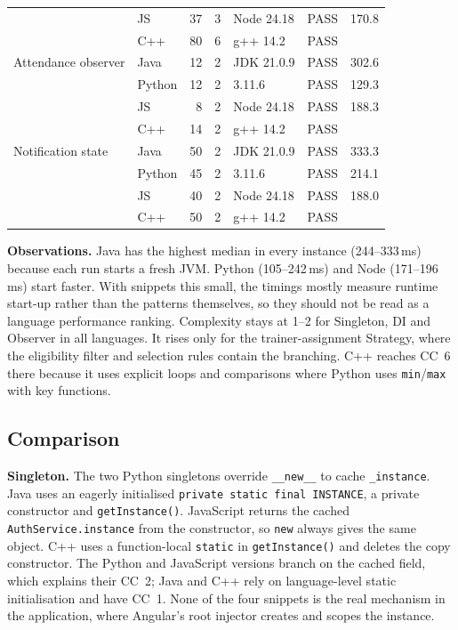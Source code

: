\documentclass[11pt,a4paper]{article}
\begin{document}
{\begin{longtable}{@{}llrrll r@{}}
 & JS & 37 & 3 & Node 24.18 & PASS & 170.8\\
 & C++ & 80 & 6 & g++ 14.2 & PASS & \\
\midrule
Attendance observer & Java & 12 & 2 & JDK 21.0.9 & PASS & 302.6\\
 & Python & 12 & 2 & 3.11.6 & PASS & 129.3\\
 & JS & 8 & 2 & Node 24.18 & PASS & 188.3\\
 & C++ & 14 & 2 & g++ 14.2 & PASS & \\
\midrule
Notification state & Java & 50 & 2 & JDK 21.0.9 & PASS & 333.3\\
 & Python & 45 & 2 & 3.11.6 & PASS & 214.1\\
 & JS & 40 & 2 & Node 24.18 & PASS & 188.0\\
 & C++ & 50 & 2 & g++ 14.2 & PASS& \\
\bottomrule
\end{longtable}
}


\textbf{Observations.} Java has the highest median in every instance (244--333\,ms) because each run starts a fresh JVM. Python (105--242\,ms) and Node (171--196\,ms) start faster. With snippets this small, the timings mostly measure runtime start-up rather than the patterns themselves, so they should not be read as a language performance ranking. Complexity stays at 1--2 for Singleton, DI and Observer in all languages. It rises only for the trainer-assignment Strategy, where the eligibility filter and selection rules contain the branching. C++ reaches CC~6 there because it uses explicit loops and comparisons where Python uses \texttt{min}/\texttt{max} with key functions.

\subsection{Comparison}

\textbf{Singleton.} The two Python singletons override \texttt{\_\_new\_\_} to cache \texttt{\_instance}. Java uses an eagerly initialised \texttt{private static final INSTANCE}, a private constructor and \texttt{getInstance()}. JavaScript returns the cached \texttt{AuthService.instance} from the constructor, so \texttt{new} always gives the same object. C++ uses a function-local \texttt{static} in \texttt{getInstance()} and deletes the copy constructor. The Python and JavaScript versions branch on the cached field, which explains their CC~2; Java and C++ rely on language-level static initialisation and have CC~1. None of the four snippets is the real mechanism in the application, where Angular's root injector creates and scopes the instance.
\end{document}
